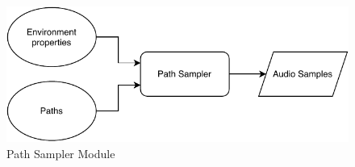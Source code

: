 \begin{figure}[H]
    \begin{center}
    \includegraphics[width=\textwidth]{figures/approach/figPathSampler.pdf}
    \end{center}
    \caption[Path Sampler Module]{Path Sampler Module}
    \label{fig:pathSampler}
\end{figure}
